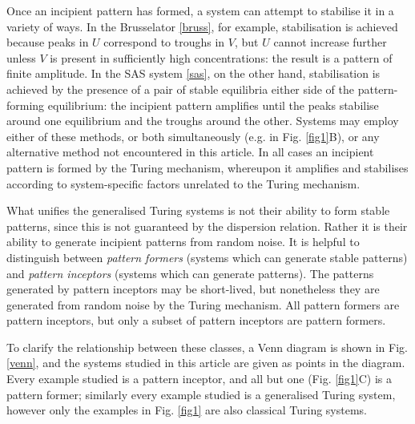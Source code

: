 Once an incipient pattern has formed, a system can attempt to stabilise it in a variety of ways. In the Brusselator \eqref{bruss}, for example, stabilisation is achieved because peaks in $U$ correspond to troughs in $V$, but $U$ cannot increase further unless $V$ is present in sufficiently high concentrations: the result is a pattern of finite amplitude. In the SAS system \eqref{sas}, on the other hand, stabilisation is achieved by the presence of a pair of stable equilibria either side of the pattern-forming equilibrium: the incipient pattern amplifies until the peaks stabilise around one equilibrium and the troughs around the other. Systems may employ either of these methods, or both simultaneously (e.g. in Fig. \ref{fig1}B), or any alternative method not encountered in this article. In all cases an incipient pattern is formed by the Turing mechanism, whereupon it amplifies and stabilises according to system-specific factors unrelated to the Turing mechanism.

What unifies the generalised Turing systems is not their ability to form stable patterns, since this is not guaranteed by the dispersion relation. Rather it is their ability to generate incipient patterns from random noise. It is helpful to distinguish between \emph{pattern formers} (systems which can generate stable patterns) and \emph{pattern inceptors} (systems which can generate patterns). The patterns generated by pattern inceptors may be short-lived, but nonetheless they are generated from random noise by the Turing mechanism. All pattern formers are pattern inceptors, but only a subset of pattern inceptors are pattern formers.

To clarify the relationship between these classes, a Venn diagram is shown in Fig. \ref{venn}, and the systems studied in this article are given as points in the diagram. Every example studied is a pattern inceptor, and all but one (Fig. \ref{fig1}C) is a pattern former; similarly every example studied is a generalised Turing system, however only the examples in Fig. \ref{fig1} are also classical Turing systems.

